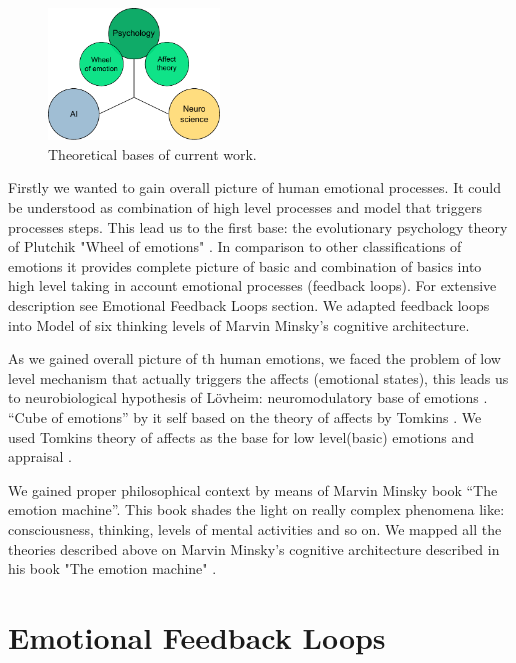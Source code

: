 \begin{figure}
\begin{center}
 \includegraphics[height=3.5cm]{figure1_3_bases}
\end{center}
\caption{Theoretical bases of current work.}
\label{3_bases}
\end{figure}

Firstly we wanted to gain overall picture of human emotional processes. It could be understood as combination of high level processes and model that triggers processes steps. This lead us to the first base: the evolutionary psychology theory of Plutchik "Wheel of emotions" \cite{natureofemotions}. In comparison to other classifications of emotions it provides complete picture of basic and combination of basics into high level taking in account emotional processes (feedback loops). For extensive description see Emotional Feedback Loops section. We adapted feedback loops into Model of six \cite{emotionmachine} thinking levels of Marvin Minsky's cognitive architecture.

As we gained overall picture of th human emotions, we faced the problem of low level mechanism that actually triggers the affects (emotional states), this leads us to neurobiological hypothesis of L\"{o}vheim: neuromodulatory base of emotions \cite{cubeofemotions}. ``Cube of emotions'' by it self based on the theory of affects by Tomkins \cite{primer_affect_psychology, tomkins1, tomkins2, tomkins3}. We used Tomkins theory of affects as the base for low level(basic) emotions and appraisal \cite{primer_affect_psychology, appraisal_considered_as_a_process, appraisal_determinants_of_emotions, putting_appraisal_in_context}.

We gained proper philosophical context by means of Marvin Minsky book ``The emotion machine''. This book shades the light on really complex phenomena like: consciousness, thinking, levels of mental activities and so on. We mapped all the theories described above on Marvin Minsky's cognitive architecture described in his book "The emotion machine" \cite{emotionmachine}.

\section{Emotional Feedback Loops}

